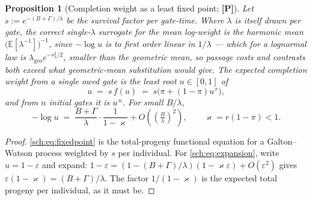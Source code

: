 \documentclass[11pt]{article}
\numberwithin{equation}{section}
\theoremstyle{plain}
\newtheorem{proposition}[theorem]{Proposition}
\theoremstyle{definition}
\theoremstyle{remark}
\newcommand{\E}{\mathbb{E}}
\begin{document}
\begin{proposition}[Completion weight as a least fixed point;
\textbf{[P]}]\label{sch:prop:fixedpoint}
Let $s:=e^{-(B+\Gamma)/\lambda}$ be the survival factor per gate-time.
Where $\lambda$ is itself drawn per gate, the correct single-$\lambda$
surrogate for the mean log-weight is the \emph{harmonic} mean
$\bigl(\E[\lambda^{-1}]\bigr)^{-1}$, since $-\log u$ is to first order
linear in $1/\lambda$ --- which for a lognormal law is
$\lambda_{\mathrm{geo}}e^{-s_\lambda^{2}/2}$, smaller than the geometric
mean, so passage costs and contrasts both exceed what
geometric-mean substitution would give. The
expected completion weight from a single owed gate is the least root
$u\in[0,1]$ of
\begin{equation}\label{sch:eq:fixedpoint}
u\;=\;s\,f(u)\;=\;s\bigl(\pi+(1-\pi)u^{\,r}\bigr),
\end{equation}
and from $n$ initial gates it is $u^{\,n}$. For small $B/\lambda$,
\begin{equation}\label{sch:eq:expansion}
-\log u\;=\;\frac{B+\Gamma}{\lambda}\cdot\frac{1}{1-\varkappa}
+O\!\left(\left(\tfrac{B}{\lambda}\right)^{2}\right),
\qquad \varkappa=r(1-\pi)<1 .
\end{equation}
\end{proposition}

\begin{proof}
\eqref{sch:eq:fixedpoint} is the total-progeny functional equation for a
Galton--Watson process weighted by $s$ per individual. For
\eqref{sch:eq:expansion}, write $u=1-\varepsilon$ and expand:
$1-\varepsilon=(1-(B+\Gamma)/\lambda)(1-\varkappa\varepsilon)+O(\varepsilon^{2})$
gives $\varepsilon(1-\varkappa)=(B+\Gamma)/\lambda$. The factor $1/(1-\varkappa)$ is the expected total
progeny per individual, as it must be.
\end{proof}
\end{document}
